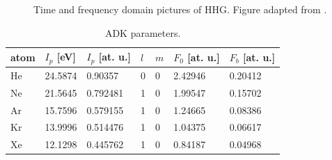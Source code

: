 \begin{figure}
	\centering
	\qquad
	\caption{Time and frequency domain pictures of HHG. Figure adapted from \cite{eichTimeAngleresolvedPhotoemission2014}.}
	\label{fig:APT_IR_field}
\end{figure}

\begin{table}[]
	\centering
	\begin{tabular}{l|l|l|l|l|l|l}
		atom & $I_p$ {[}eV{]} & $I_p$ {[}at. u.{]} & $l$ & $m$ & $F_0$ {[}at. u.{]} & $F_b$ {[}at. u.{]} \\ \hline
		He & 24.5874 & 0.90357 & 0 & 0 & 2.42946 & 0.20412 \\
		Ne & 21.5645 & 0.792481 & 1 & 0 & 1.99547 & 0.15702 \\
		Ar & 15.7596 & 0.579155 & 1 & 0 & 1.24665 & 0.08386 \\
		Kr & 13.9996 & 0.514476 & 1 & 0 & 1.04375 & 0.06617 \\
		Xe & 12.1298 & 0.445762 & 1 & 0 & 0.84187 & 0.04968
	\end{tabular}
	\caption{ADK parameters.}
	\label{tab:ADK-params}
\end{table}

